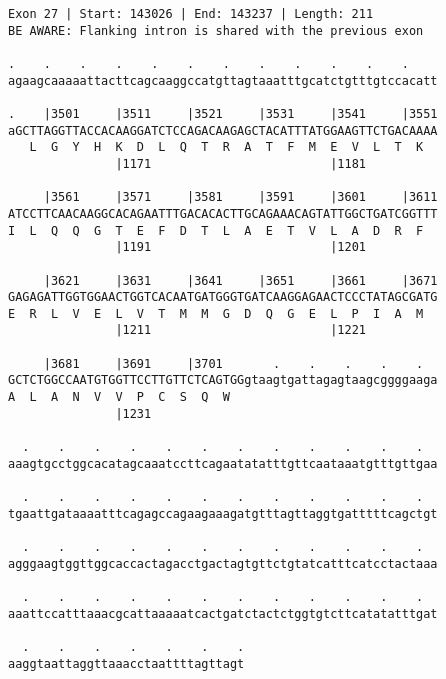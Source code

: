 \documentclass{article}
\begin{document}
\begin{Verbatim}
Exon 27 | Start: 143026 | End: 143237 | Length: 211
BE AWARE: Flanking intron is shared with the previous exon
 
.    .    .    .    .    .    .    .    .    .    .    .    
agaagcaaaaattacttcagcaaggccatgttagtaaatttgcatctgtttgtccacatt
  
.    |3501     |3511     |3521     |3531     |3541     |3551
aGCTTAGGTTACCACAAGGATCTCCAGACAAGAGCTACATTTATGGAAGTTCTGACAAAA
   L  G  Y  H  K  D  L  Q  T  R  A  T  F  M  E  V  L  T  K  
               |1171                         |1181          
  
     |3561     |3571     |3581     |3591     |3601     |3611
ATCCTTCAACAAGGCACAGAATTTGACACACTTGCAGAAACAGTATTGGCTGATCGGTTT
I  L  Q  Q  G  T  E  F  D  T  L  A  E  T  V  L  A  D  R  F  
               |1191                         |1201          
  
     |3621     |3631     |3641     |3651     |3661     |3671
GAGAGATTGGTGGAACTGGTCACAATGATGGGTGATCAAGGAGAACTCCCTATAGCGATG
E  R  L  V  E  L  V  T  M  M  G  D  Q  G  E  L  P  I  A  M  
               |1211                         |1221          
  
     |3681     |3691     |3701       .    .    .    .    .  
GCTCTGGCCAATGTGGTTCCTTGTTCTCAGTGGgtaagtgattagagtaagcggggaaga
A  L  A  N  V  V  P  C  S  Q  W                             
               |1231                                        
  
  .    .    .    .    .    .    .    .    .    .    .    .  
aaagtgcctggcacatagcaaatccttcagaatatatttgttcaataaatgtttgttgaa
  
  .    .    .    .    .    .    .    .    .    .    .    .  
tgaattgataaaatttcagagccagaagaaagatgtttagttaggtgatttttcagctgt
  
  .    .    .    .    .    .    .    .    .    .    .    .  
agggaagtggttggcaccactagacctgactagtgttctgtatcatttcatcctactaaa
  
  .    .    .    .    .    .    .    .    .    .    .    .  
aaattccatttaaacgcattaaaaatcactgatctactctggtgtcttcatatatttgat
  
  .    .    .    .    .    .    .
aaggtaattaggttaaacctaattttagttagt
\end{Verbatim}
\newpage
\end{document}
